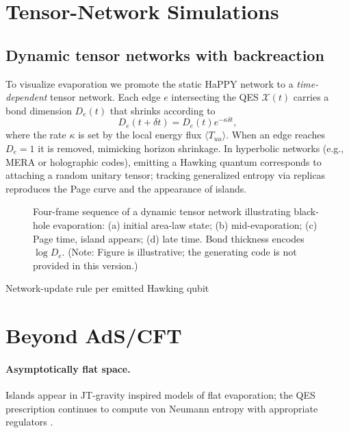 \documentclass[12pt, numbers, sort&compress]{article}
\begin{document}
\section{Tensor-Network Simulations}
\subsection{Dynamic tensor networks with backreaction}
\label{subsec:dynamicTN}
To visualize evaporation we promote the static HaPPY network \cite{HaPPY:2015} to a \emph{time-dependent} tensor network. Each edge $e$ intersecting the QES $\mathcal{X}(t)$ carries a bond dimension $D_e(t)$ that shrinks according to
\begin{equation}
D_e(t+\delta t) = D_e(t) e^{-\kappa \delta t},
\end{equation}
where the rate $\kappa$ is set by the local energy flux $\langle T_{uu}\rangle$. When an edge reaches $D_e=1$ it is removed, mimicking horizon shrinkage. In hyperbolic networks (e.g., MERA \cite{Vidal:2007MERA} or holographic codes), emitting a Hawking quantum corresponds to attaching a random unitary tensor; tracking generalized entropy via replicas reproduces the Page curve and the appearance of islands.

\begin{figure}[t]
\centering
\caption{Four-frame sequence of a dynamic tensor network illustrating black-hole evaporation: (a) initial area-law state; (b) mid-evaporation; (c) Page time, island appears; (d) late time. Bond thickness encodes $\log D_e$. (Note: Figure is illustrative; the generating code is not provided in this version.)}
\label{fig:dynamicTN}
\end{figure}

\begin{algorithm}[htbp]
\caption{Network-update rule per emitted Hawking qubit}
\end{algorithm}

\section{Beyond AdS/CFT}\label{sec:beyond}
\paragraph{Asymptotically flat space.}
Islands appear in JT-gravity inspired models of flat evaporation; the QES prescription continues to compute von Neumann entropy with appropriate regulators \cite{Gautason:2023flatIslands}.
\end{document}
